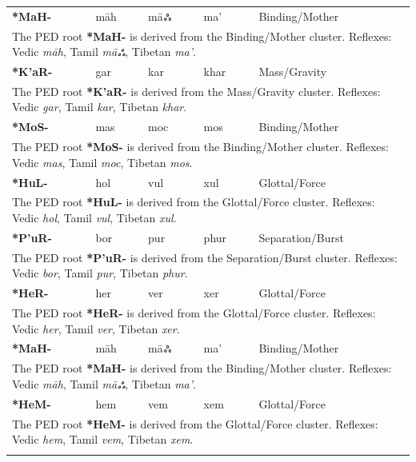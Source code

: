 \begin{longtable}{p{} p{} p{} p{} p{}}
\textbf{*MaH-} & māh & māஃ & ma' & Binding/Mother \\ 
\multicolumn{5}{p{\textwidth}}{\small The PED root \textbf{*MaH-} is derived from the Binding/Mother cluster. Reflexes: Vedic \textit{māh}, Tamil \textit{māஃ}, Tibetan \textit{ma'}. } \\ \addlinespace 
\textbf{*K'aR-} & gar & kar & khar & Mass/Gravity \\ 
\multicolumn{5}{p{\textwidth}}{\small The PED root \textbf{*K'aR-} is derived from the Mass/Gravity cluster. Reflexes: Vedic \textit{gar}, Tamil \textit{kar}, Tibetan \textit{khar}. } \\ \addlinespace 
\textbf{*MoS-} & mas & moc & mos & Binding/Mother \\ 
\multicolumn{5}{p{\textwidth}}{\small The PED root \textbf{*MoS-} is derived from the Binding/Mother cluster. Reflexes: Vedic \textit{mas}, Tamil \textit{moc}, Tibetan \textit{mos}. } \\ \addlinespace 
\textbf{*HuL-} & hol & vul & xul & Glottal/Force \\ 
\multicolumn{5}{p{\textwidth}}{\small The PED root \textbf{*HuL-} is derived from the Glottal/Force cluster. Reflexes: Vedic \textit{hol}, Tamil \textit{vul}, Tibetan \textit{xul}. } \\ \addlinespace 
\textbf{*P'uR-} & bor & pur & phur & Separation/Burst \\ 
\multicolumn{5}{p{\textwidth}}{\small The PED root \textbf{*P'uR-} is derived from the Separation/Burst cluster. Reflexes: Vedic \textit{bor}, Tamil \textit{pur}, Tibetan \textit{phur}. } \\ \addlinespace 
\textbf{*HeR-} & her & ver & xer & Glottal/Force \\ 
\multicolumn{5}{p{\textwidth}}{\small The PED root \textbf{*HeR-} is derived from the Glottal/Force cluster. Reflexes: Vedic \textit{her}, Tamil \textit{ver}, Tibetan \textit{xer}. } \\ \addlinespace 
\textbf{*MaH-} & māh & māஃ & ma' & Binding/Mother \\ 
\multicolumn{5}{p{\textwidth}}{\small The PED root \textbf{*MaH-} is derived from the Binding/Mother cluster. Reflexes: Vedic \textit{māh}, Tamil \textit{māஃ}, Tibetan \textit{ma'}. } \\ \addlinespace 
\textbf{*HeM-} & hem & vem & xem & Glottal/Force \\ 
\multicolumn{5}{p{\textwidth}}{\small The PED root \textbf{*HeM-} is derived from the Glottal/Force cluster. Reflexes: Vedic \textit{hem}, Tamil \textit{vem}, Tibetan \textit{xem}. } \\ \addlinespace 

\end{longtable}
